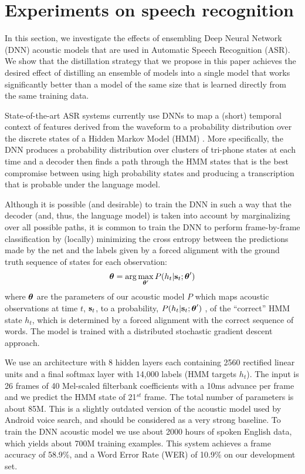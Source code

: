 \section{Experiments on speech recognition}\label{sec:speech}

In this section, we investigate the effects of ensembling Deep Neural Network (DNN) acoustic models that are used in
Automatic Speech Recognition (ASR).  We show that the distillation strategy that we propose in this paper achieves the
desired effect of distilling an ensemble of models into a single model that works significantly better than a model of
the same size that is learned directly from the same training data.

State-of-the-art ASR systems currently use DNNs to map a (short) temporal context of features derived
from the waveform to a probability distribution over the discrete states of a Hidden Markov Model (HMM) \cite{SPM}. More
specifically, the DNN produces a probability distribution over clusters of tri-phone states at each time and a decoder
then finds a path through the HMM states that is the best compromise between using high probability states and producing
a transcription that is probable under the language model.

Although it is possible (and desirable) to train the DNN in such a way that the decoder (and, thus, the language model)
is taken into account by marginalizing over all possible paths, it is common to train the DNN to perform frame-by-frame
classification by (locally) minimizing the cross entropy between the predictions made by the net and the labels given
by a forced alignment with the ground truth sequence of states for each observation:
$$\boldsymbol{\theta} = \arg\max_{\boldsymbol{\theta}'} P(h_t | \mathbf{s}_t;\boldsymbol{\theta}')$$
where $\boldsymbol{\theta}$ are the parameters of our acoustic model $P$
which maps acoustic observations at time $t$, $\mathbf{s}_t$, to a probability, $P(h_t | \mathbf{s}_t;\boldsymbol{\theta}')$ , of the ``correct''
HMM state $h_t$, which is determined by a forced alignment with the correct sequence of words. The model is trained with
a distributed stochastic gradient descent approach. 

We use an architecture with 8 hidden layers each containing 2560 rectified linear units and a final softmax layer with
14,000 labels (HMM targets $h_t$).  The input is 26 frames of 40 Mel-scaled filterbank coefficients with a 10ms advance
per frame and we predict the HMM state of 21$^{st}$ frame.  The total number of parameters is about 85M. This is a
slightly outdated version of the acoustic model used by Android voice search, and should be considered as a very strong
baseline. To train the DNN acoustic model we use about 2000 hours of spoken English data, which yields about 700M
training examples. This system achieves a frame accuracy of 58.9\%, and a Word Error Rate (WER) of 10.9\% on our development set.


